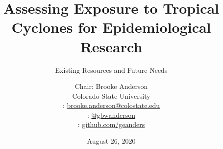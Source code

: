 \usepackage{booktabs}
\usepackage{array}
\usepackage{colortbl}
\usepackage[british]{babel}
\usepackage{graphicx,hyperref,url}
\usepackage{fontawesome}
\usepackage{hyperref}
\usepackage{adjustbox}
\usepackage{appendixnumberbeamer}
\hypersetup{colorlinks=true,allcolors=blue}

\title{Assessing Exposure to Tropical Cyclones for Epidemiological Research}
\subtitle{Existing Resources and Future Needs}
\date{August 26, 2020}

\author[Anderson]{
  Chair: Brooke Anderson \\ 
  Colorado State University \medskip \\ 
  {\small \faEnvelope: \url{brooke.anderson@colostate.edu}} \\
  {\small \faTwitter: \href{www.twitter.com/gbwanderson}{@gbwanderson}} \\
  {\small \faGithub:  \url{github.com/geanders}}
  }


